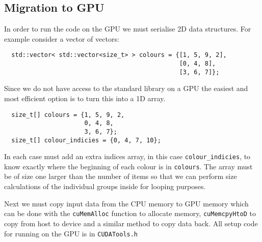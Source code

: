 \subsection{Migration to GPU} \label{sec:migration}
In order to run the code on the GPU we must serialise 2D data structures. For example consider a vector of vectors:
\begin{verbatim}
  std::vector< std::vector<size_t> > colours = {[1, 5, 9, 2],
                                                [0, 4, 8],
                                                [3, 6, 7]};
\end{verbatim}
Since we do not have access to the standard library on a GPU the easiest and most efficient option is to turn this into a 1D array.
\begin{verbatim}
  size_t[] colours = {1, 5, 9, 2,
                      0, 4, 8,
                      3, 6, 7};
  size_t[] colour_indicies = {0, 4, 7, 10};
\end{verbatim}
In each case must add an extra indices array, in this case \verb!colour_indicies!, to know exactly where the beginning of each colour is in \verb!colours!. The array must be of size one larger than the number of items so that we can perform size
calculations of the individual groups inside for looping purposes.

Next we must copy input data from the CPU memory to GPU memory which can be done with the \verb!cuMemAlloc! function to allocate memory, \verb!cuMemcpyHtoD! to copy from host to device and a similar method to copy data back. All setup code for running on the GPU is in \verb!CUDATools.h!

